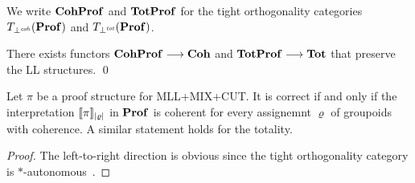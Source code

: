 We write \( \mathbf{CohProf} \) and \( \mathbf{TotProf} \) for the tight orthogonality categories \( T_{\mathrel{\bot}^{\mathit{coh}}}(\mathbf{Prof}) \) and \( T_{\mathrel{\bot}^{\mathit{tot}}}(\mathbf{Prof}) \).

\newcommand{\Coh}{\mathbf{Coh}}
\newcommand{\Tot}{\mathbf{Tot}}
\begin{proposition}
    There exists functors \( \CohProf \longrightarrow \Coh \) and \( \TotProf \longrightarrow \Tot \) that preserve the LL structures.
    \qed
\end{proposition}

\begin{theorem}
    Let \( \pi \) be a proof structure for \textsf{MLL+MIX+CUT}.
    It is correct if and only if the interpretation \( \llbracket{\pi}\rrbracket_{|\varrho|} \) in \( \mathbf{Prof} \) is coherent for every assignemnt \( \varrho \) of groupoids with coherence.
    A similar statement holds for the totality.
\end{theorem}
\begin{proof}
    The left-to-right direction is obvious since the tight orthogonality category is \( * \)-autonomous~\cite{Hyland2003}.
\end{proof}
